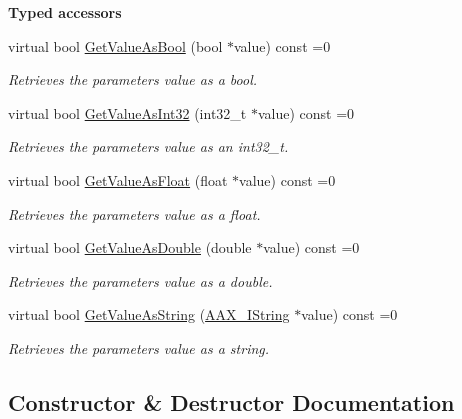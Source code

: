 \begin{Indent}{\bf Typed accessors}\par
\begin{DoxyCompactItemize}
\item 
virtual bool \hyperlink{a00109_a5d792ea5770ace586d5de9e32f35773d}{Get\+Value\+As\+Bool} (bool $\ast$value) const =0
\begin{DoxyCompactList}\small\item\em Retrieves the parameter\textquotesingle{}s value as a bool. \end{DoxyCompactList}\item 
virtual bool \hyperlink{a00109_a94ff37ade5306ff8832a9848007c6397}{Get\+Value\+As\+Int32} (int32\+\_\+t $\ast$value) const =0
\begin{DoxyCompactList}\small\item\em Retrieves the parameter\textquotesingle{}s value as an int32\+\_\+t. \end{DoxyCompactList}\item 
virtual bool \hyperlink{a00109_a4dc47beae09bee0025374e32ccae17fb}{Get\+Value\+As\+Float} (float $\ast$value) const =0
\begin{DoxyCompactList}\small\item\em Retrieves the parameter\textquotesingle{}s value as a float. \end{DoxyCompactList}\item 
virtual bool \hyperlink{a00109_acb2b95aa6a7f95344b320f71ceb84a9d}{Get\+Value\+As\+Double} (double $\ast$value) const =0
\begin{DoxyCompactList}\small\item\em Retrieves the parameter\textquotesingle{}s value as a double. \end{DoxyCompactList}\item 
virtual bool \hyperlink{a00109_ad58947974003a0296540d18849d4350c}{Get\+Value\+As\+String} (\hyperlink{a00113}{A\+A\+X\+\_\+\+I\+String} $\ast$value) const =0
\begin{DoxyCompactList}\small\item\em Retrieves the parameter\textquotesingle{}s value as a string. \end{DoxyCompactList}\end{DoxyCompactItemize}
\end{Indent}


\subsection{Constructor \& Destructor Documentation}
\hypertarget{a00109_a01435046395e84c47eef1e154b372823}{}
